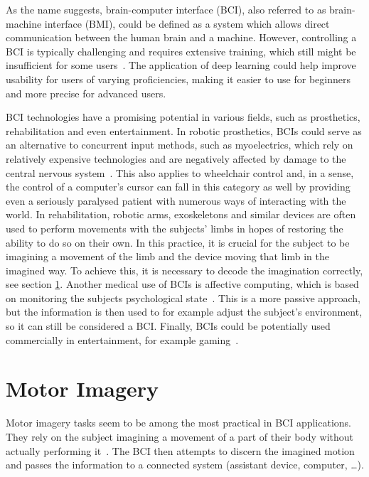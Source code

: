 \documentclass[english, he, bc, kiv, iso690alph]{fasthesis}
\begin{document}
As the name suggests, brain-computer interface (BCI), also referred to as brain-machine interface (BMI), could be defined as a system which allows direct communication between the human brain and a machine. However, controlling a BCI is typically challenging and requires extensive training, which still might be insufficient for some users~\cite{data:stieger:21}. The application of deep learning could help improve usability for users of varying proficiencies, making it easier to use for beginners and more precise for advanced users.

BCI technologies have a promising potential in various fields, such as prosthetics, rehabilitation and even entertainment.
In robotic prosthetics, BCIs could serve as an alternative to concurrent input methods, such as myoelectrics, which rely on relatively expensive technologies and are negatively affected by damage to the central nervous system~\cite{padfield:bci:19}. This also applies to wheelchair control and, in a sense, the control of a computer's cursor can fall in this category as well by providing even a seriously paralysed patient with numerous ways of interacting with the world.
In rehabilitation, robotic arms, exoskeletons and similar devices are often used to perform movements with the subjects' limbs in hopes of restoring the ability to do so on their own. In this practice, it is crucial for the subject to be imagining a movement of the limb and the device moving that limb in the imagined way. To achieve this, it is necessary to decode the imagination correctly, see section \ref{sec:mi}.
Another medical use of BCIs is affective computing, which is based on monitoring the subjects psychological state~\cite{padfield:bci:19}. This is a more passive approach, but the information is then used to for example adjust the subject's environment, so it can still be considered a BCI.
Finally, BCIs could be potentially used commercially in entertainment, for example gaming~\cite{padfield:bci:19}.

\section{Motor Imagery}
\label{sec:mi}

Motor imagery tasks seem to be among the most practical in BCI applications.
They rely on the subject imagining a movement of a part of their body without actually performing it~\cite{craik:dl:eeg:rev:19}.
The BCI then attempts to discern the imagined motion and passes the information to a connected system (assistant device, computer, \dots).
\end{document}
